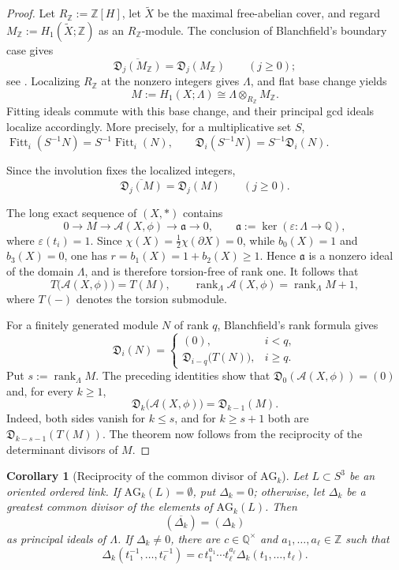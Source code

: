 \documentclass{article}
\theoremstyle{definition}
\theoremstyle{plain}
\newtheorem{corollary}[definition]{Corollary}
\newcommand{\Q}{{\mathbb{Q}}}
\newcommand{\AG}{\mathrm{AG}}
\newcommand{\Z}{\mathbb{Z}}
\newcommand{\Fitt}{\operatorname{Fitt}}
\begin{document}
\begin{proof}
Let \(R_{\Z}:=\Z[H]\), let \(\widetilde X\) be the maximal free-abelian
cover, and regard
\(M_{\Z}:=H_1(\widetilde X;\Z)\) as an \(R_{\Z}\)-module.  The conclusion
of Blanchfield's boundary case gives
\[
 \overline{\mathfrak D_j(M_{\Z})}=\mathfrak D_j(M_{\Z})
 \qquad(j\ge0);
\]
see \cite[Thms.~4.5 and~4.7, Cor.~4.8, Lem.~4.10,
Thm.~5.5, and Cor.~5.6]{Bla}.  Localizing \(R_{\Z}\) at the nonzero
integers gives \(\Lambda\), and flat base change yields
\[
 M:=H_1(X;\Lambda)\cong\Lambda\otimes_{R_{\Z}}M_{\Z}.
\]
Fitting ideals commute with this base change, and their principal gcd
ideals localize accordingly.  More precisely, for a multiplicative set \(S\),
\(
\Fitt_i(S^{-1}N)=S^{-1}\Fitt_i(N),
\qquad
\mathfrak D_i(S^{-1}N)=S^{-1}\mathfrak D_i(N).
\)

Since the involution fixes the localized
integers,
\[
 \overline{\mathfrak D_j(M)}=\mathfrak D_j(M)
 \qquad(j\ge0).
\]

The long exact sequence of \((X,*)\) contains
\[
 0\longrightarrow M\longrightarrow\mathcal A(X,\phi)
 \longrightarrow\mathfrak a\longrightarrow0,
 \qquad
 \mathfrak a:=\ker(\varepsilon\colon\Lambda\longrightarrow\Q),
\]
where \(\varepsilon(t_i)=1\).  Since
\(\chi(X)=\frac12\chi(\partial X)=0\), while \(b_0(X)=1\) and
\(b_3(X)=0\), one has \(r=b_1(X)=1+b_2(X)\ge1\).  Hence
\(\mathfrak a\) is a nonzero ideal of the domain \(\Lambda\), and is
therefore torsion-free of rank one.  It follows that
\[
 T\bigl(\mathcal A(X,\phi)\bigr)=T(M),
 \qquad
 \operatorname{rank}_{\Lambda}\mathcal A(X,\phi)
 =\operatorname{rank}_{\Lambda}M+1,
\]
where \(T(-)\) denotes the torsion submodule.

For a finitely generated module \(N\) of rank \(q\), Blanchfield's rank
formula \cite[Lem.~4.10]{Bla} gives
\[
 \mathfrak D_i(N)=
 \begin{cases}
  (0),&i<q,\\
  \mathfrak D_{i-q}\bigl(T(N)\bigr),&i\ge q.
 \end{cases}
\]
Put \(s:=\operatorname{rank}_{\Lambda}M\).  The preceding identities show
that \(\mathfrak D_0(\mathcal A(X,\phi))=(0)\) and, for every \(k\ge1\),
\[
 \mathfrak D_k\bigl(\mathcal A(X,\phi)\bigr)=\mathfrak D_{k-1}(M).
\]
Indeed, both sides vanish for \(k\le s\), and for \(k\ge s+1\) both are
\(\mathfrak D_{k-s-1}(T(M))\).  The theorem now follows from the
reciprocity of the determinant divisors of \(M\).
\end{proof}

\begin{corollary}[Reciprocity of the common divisor of \(\AG_k\)]
\label{cor:AG-common-divisor-reciprocity}
Let \(L\subset S^3\) be an oriented ordered link.  If
\(\AG_k(L)=\emptyset\), put \(\Delta_k=0\); otherwise, let \(\Delta_k\)
be a greatest common divisor of the elements of \(\AG_k(L)\).  Then
\[
 (\overline{\Delta_k})=(\Delta_k)
\]
as principal ideals of \(\Lambda\).  If \(\Delta_k\ne0\), there are
\(c\in\Q^\times\) and \(a_1,\dots,a_\ell\in\Z\) such that
\[
 \Delta_k(t_1^{-1},\dots,t_\ell^{-1})
 =c\,t_1^{a_1}\cdots t_\ell^{a_\ell}
  \Delta_k(t_1,\dots,t_\ell).
\]
\end{corollary}
\end{document}
